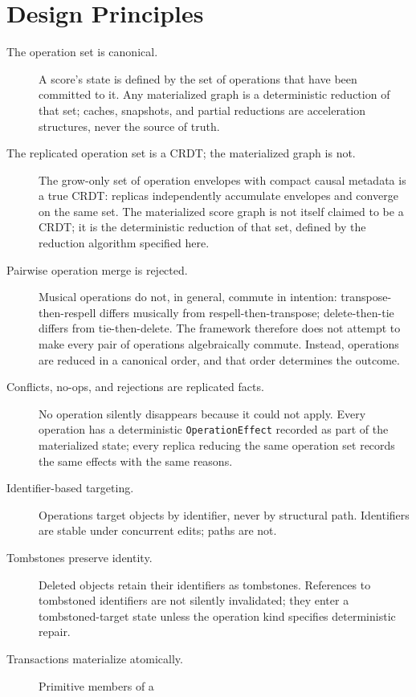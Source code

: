 \documentclass[11pt,letterpaper]{report}
\begin{document}
\section{Design Principles}
\label{sec:semops:principles}

\begin{description}
  \item[The operation set is canonical.] A score's state is defined
    by the set of operations that have been committed to it. Any
    materialized graph is a deterministic reduction of that set;
    caches, snapshots, and partial reductions are acceleration
    structures, never the source of truth.
  \item[The replicated operation set is a CRDT; the materialized
    graph is not.] The grow-only set of operation envelopes with
    compact causal metadata is a true CRDT: replicas independently
    accumulate envelopes and converge on the same set. The
    materialized score graph is not itself claimed to be a CRDT; it
    is the deterministic reduction of that set, defined by the
    reduction algorithm specified here.
  \item[Pairwise operation merge is rejected.] Musical operations
    do not, in general, commute in intention: transpose-then-respell
    differs musically from respell-then-transpose; delete-then-tie
    differs from tie-then-delete. The framework therefore does not
    attempt to make every pair of operations algebraically commute.
    Instead, operations are reduced in a canonical order, and that
    order determines the outcome.
  \item[Conflicts, no-ops, and rejections are replicated facts.] No
    operation silently disappears because it could not apply. Every
    operation has a deterministic \texttt{OperationEffect} recorded
    as part of the materialized state; every replica reducing the
    same operation set records the same effects with the same
    reasons.
  \item[Identifier-based targeting.] Operations target objects by
    identifier, never by structural path. Identifiers are stable
    under concurrent edits; paths are not.
  \item[Tombstones preserve identity.] Deleted objects retain their
    identifiers as tombstones. References to tombstoned identifiers
    are not silently invalidated; they enter a tombstoned-target
    state unless the operation kind specifies deterministic repair.
  \item[Transactions materialize atomically.] Primitive members of a

\end{description}
\end{document}
